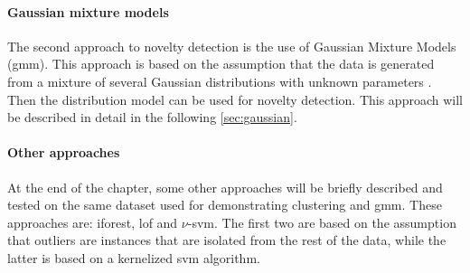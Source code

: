 \paragraph[]{Gaussian mixture models}
The second approach to novelty detection is the use of Gaussian Mixture Models (\gls{gmm}). This approach is based on the assumption that the data is generated from a mixture of several Gaussian distributions with unknown parameters . Then the distribution model can be used for novelty detection. This approach will be described in detail in the following \autoref{sec:gaussian}.

\paragraph{Other approaches}
At the end of the chapter, some other approaches will be briefly described and tested on the same dataset used for demonstrating clustering and \gls{gmm}. These approaches are: \gls{iforest}, \gls{lof} and $\nu$-\gls{svm}. The first two are based on the assumption that outliers are instances that are isolated from the rest of the data, while the latter is based on a kernelized \gls{svm} algorithm. 







